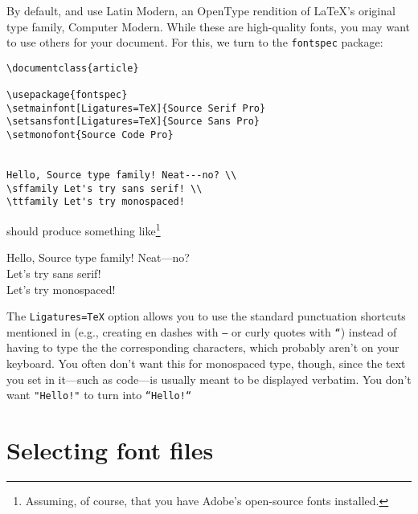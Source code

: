 By default, \LuaLaTeX{} and \XeLaTeX{} use Latin Modern,
an OpenType rendition of \LaTeX's original type family, Computer Modern.
While these are high-quality fonts,
you may want to use others for your document.
For this, we turn to the \texttt{fontspec} package:
\begin{leftfigure}
\begin{lstlisting}
\documentclass{article}

\usepackage{fontspec}
\setmainfont[Ligatures=TeX]{Source Serif Pro}
\setsansfont[Ligatures=TeX]{Source Sans Pro}
\setmonofont{Source Code Pro}


Hello, Source type family! Neat---no? \\
\sffamily Let's try sans serif! \\
\ttfamily Let's try monospaced!

\end{lstlisting}
\end{leftfigure}
should produce something like\footnote{Assuming, of course,
that you have Adobe's open-source fonts installed.\punckern{}}
\begin{leftfigure}
 Hello, Source type family! Neat---no? \\
 Let's try sans serif! \\
 Let's try monospaced!
\end{leftfigure}
The \verb|Ligatures=TeX| option allows you to use the standard punctuation
shortcuts mentioned in  (e.g., creating en dashes with
\texttt{--} or curly quotes with \texttt{``}) instead of having
to type the the corresponding characters, which probably aren't on your keyboard.
You often don't want this for monospaced type, though,
since the text you set in it---such as code---is usually meant to be displayed
verbatim. You don't want \verb|"Hello!"| to turn into
\verb|“Hello!“|

\section{Selecting font files}

